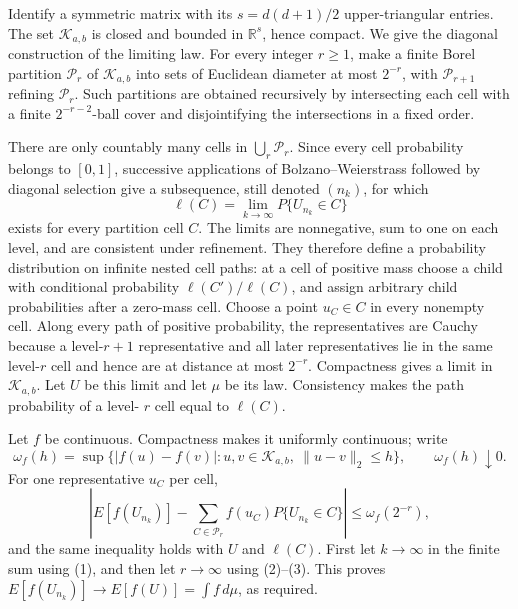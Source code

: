 Identify a symmetric matrix with its \(s=d(d+1)/2\) upper-triangular entries. The set \(\mathcal K_{a,b}\) is closed and bounded in \(\mathbb R^s\), hence compact. We give the diagonal construction of the limiting law. For every integer \(r\ge1\), make a finite Borel partition \(\mathcal P_r\) of \(\mathcal K_{a,b}\) into sets of Euclidean diameter at most \(2^{-r}\), with \(\mathcal P_{r+1}\) refining \(\mathcal P_r\). Such partitions are obtained recursively by intersecting each cell with a finite \(2^{-r-2}\)-ball cover and disjointifying the intersections in a fixed order.

There are only countably many cells in \(\bigcup_r\mathcal P_r\). Since every cell probability belongs to \([0,1]\), successive applications of Bolzano--Weierstrass followed by diagonal selection give a subsequence, still denoted \((n_k)\), for which
\[
 \ell(C)=\lim_{k\to\infty}P\{U_{n_k}\in C\}
 \tag{1}
\]
exists for every partition cell \(C\). The limits are nonnegative, sum to one on each level, and are consistent under refinement. They therefore define a probability distribution on infinite nested cell paths: at a cell of positive mass choose a child with conditional probability \(\ell(C')/\ell(C)\), and assign arbitrary child probabilities after a zero-mass cell. Choose a point \(u_C\in C\) in every nonempty cell. Along every path of positive probability, the representatives are Cauchy because a level-\(r+1\) representative and all later representatives lie in the same level-\(r\) cell and hence are at distance at most \(2^{-r}\). Compactness gives a limit in \(\mathcal K_{a,b}\). Let \(U\) be this limit and let \(\mu\) be its law. Consistency makes the path probability of a level-
\(r\) cell equal to \(\ell(C)\).

Let \(f\) be continuous. Compactness makes it uniformly continuous; write
\[
 \omega_f(h)=\sup\{|f(u)-f(v)|:u,v\in\mathcal K_{a,b},\ \|u-v\|_2\le h\},
 \qquad \omega_f(h)\downarrow0. \tag{2}
\]
For one representative \(u_C\) per cell,
\[
 \left|E[f(U_{n_k})]-\sum_{C\in\mathcal P_r}f(u_C)P\{U_{n_k}\in C\}\right|
 \le\omega_f(2^{-r}), \tag{3}
\]
and the same inequality holds with \(U\) and \(\ell(C)\). First let \(k\to\infty\) in the finite sum using (1), and then let \(r\to\infty\) using (2)--(3). This proves \(E[f(U_{n_k})]\to E[f(U)]=\int f\,d\mu\), as required.